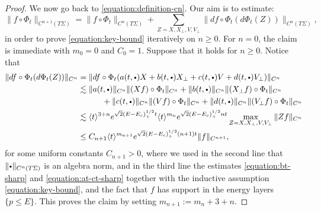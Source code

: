 \documentclass[10pt]{amsart}
\newcommand{\sbullet}{{\scriptscriptstyle\bullet}}
\newcommand{\csbullet}{{\raisebox{1pt}{$\sbullet$}}}
\theoremstyle{plain}
\theoremstyle{definition}
\begin{document}
\begin{proof}
We now go back to \eqref{equation:definition-cn}. Our aim is to estimate:
\[
\|f\circ\Phi_t\|_{C^{n+1}(T\Sigma)} = \|f\circ\Phi_t\|_{C^n(T\Sigma)} + \sum_{Z = X,X_\perp,V,V_\perp} \|df \circ \Phi_t (d\Phi_t(Z))\|_{C^n(T\Sigma)},
\]
in order to prove \eqref{equation:key-bound} iteratively on $n \geq 0$. For $n = 0$, the claim is immediate with $m_0 = 0$ and $C_0 = 1$. Suppose that it holds for $n \geq 0$. Notice that
\[
\begin{split}
\|df \circ \Phi_t (d\Phi_t(Z))\|_{C^n} & = \|df \circ \Phi_t (a(t,\csbullet) X + b(t,\csbullet) X_\perp + c(t,\csbullet) V + d(t,\csbullet) V_\perp)\|_{C^n} \\
& \lesssim \|a(t,\csbullet)\|_{C^n} \|(Xf)\circ\Phi_t\|_{C^n} + \|b(t,\csbullet)\|_{C^n} \|(X_\perp f)\circ\Phi_t\|_{C^n} \\
& \hspace*{1.05cm} + \|c(t,\csbullet)\|_{C^n} \|(Vf)\circ\Phi_t\|_{C^n} + \|d(t,\csbullet)\|_{C^n} \|(V_\perp f)\circ\Phi_t\|_{C^n} \\
& \lesssim \langle t \rangle^{3+n} e^{\sqrt{2}(E-E_c)_+^{1/2}t} \langle t \rangle^{m_n} e^{\sqrt{2}(E-E_c)_+^{1/2}nt} \max_{Z=X,X_\perp,V,V_\perp}\|Z f\|_{C^n} \\
& \leq C_{n+1}\langle t \rangle^{m_{n+1}} e^{\sqrt{2}(E-E_c)_+^{1/2}(n+1)t} \|f\|_{C^{n+1}},
\end{split}
\]
for some uniform constants $C_{n+1} > 0$, where we used in the second line that $\|\csbullet\|_{C^n(T\Sigma)}$ is an algebra norm, and in the third line the estimates \eqref{equation:bt-sharp} and \eqref{equation:at-ct-sharp} together with the inductive assumption \eqref{equation:key-bound}, and the fact that $f$ has support in the energy layers $\{p \leq E\}$. This proves the claim by setting $m_{n+1} := m_n + 3 + n$.
\end{proof}
\end{document}

